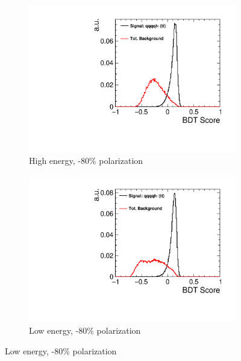 \begin{figure}[ht] 
  \begin{subfigure}[b]{0.5\linewidth}
    \centering
    \includegraphics[width=0.99\linewidth]{TopAnalysis/figures/BDTScoreHighENeg.pdf} 
    \caption{High energy, -80\% polarization} 
    \vspace{4ex}
  \end{subfigure}%
  \begin{subfigure}[b]{0.5\linewidth}
    \centering
    \includegraphics[width=0.99\linewidth]{TopAnalysis/figures/BDTScoreLowENeg.pdf} 
    \caption{Low energy, -80\% polarization} 
    \vspace{4ex}
  \end{subfigure} 
\end{figure}

